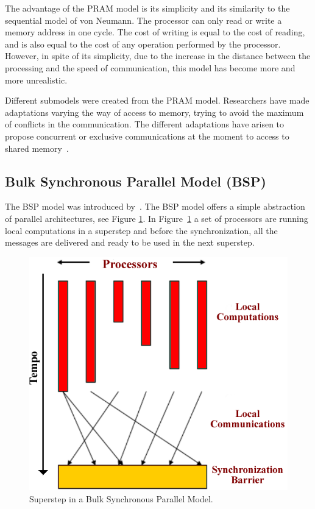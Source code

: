 The advantage of the PRAM model is its simplicity and its similarity to the sequential model of von Neumann. The processor can only read or write a memory address in one cycle. The cost of writing is equal to the cost of reading, and is also equal to the cost of any operation performed by the processor. However, in spite of its simplicity, due to the increase in the distance between the processing and the speed of communication, this model has become more and more unrealistic.

Different submodels were created from the PRAM model. Researchers have made adaptations varying the way of access to memory, trying to avoid the maximum of conflicts in the communication. The different adaptations have arisen to propose concurrent or exclusive communications at the moment to access to shared memory~\citep{Gibbons19983:QRQW, Karp:CSD-88-408}. 

\subsection{Bulk Synchronous Parallel Model (BSP)}
The BSP model was introduced by~\cite{Valiant:1990}. The BSP model offers a simple abstraction of parallel architectures, see Figure \ref{fig:BSP}. In Figure~\ref{fig:BSP} a set of processors are running local computations in a superstep and before the synchronization, all the messages are delivered and ready to be used in the next superstep.

\begin{figure}[htpb]
\centering
\includegraphics[scale=.7]{./images/bspmodel.png}
\caption{Superstep in a Bulk Synchronous Parallel Model.}
\label{fig:BSP}
\end{figure}

